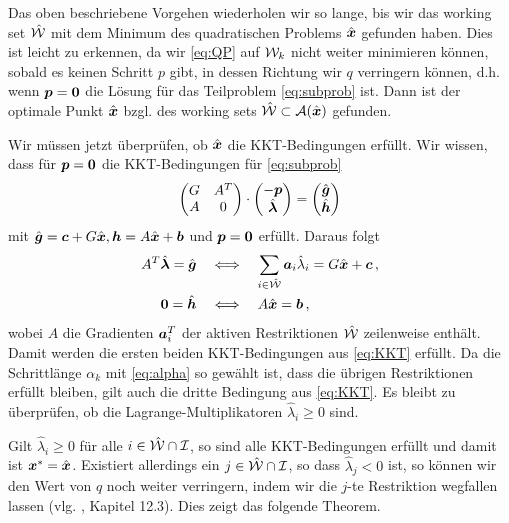 Das oben beschriebene Vorgehen wiederholen wir so lange, bis wir das {working set} $\hat {\mathcal W}$ mit dem Minimum des quadratischen Problems $\hat{\boldsymbol x}$ gefunden haben. Dies ist leicht zu erkennen, da wir \eqref{eq:QP} auf $\mathcal W_k$ nicht weiter minimieren können, sobald es keinen Schritt $p$ gibt, in dessen Richtung wir $q$ verringern können, d.h. wenn $\boldsymbol p = \boldsymbol 0$ die Lösung für das Teilproblem \eqref{eq:subprob} ist.  Dann ist der optimale Punkt $\hat{\boldsymbol x}$ bzgl. des {working sets} $\hat{\mathcal W}\subset \mathcal A(\hat{\boldsymbol x})$ gefunden.

Wir müssen jetzt überprüfen, ob $\hat{\boldsymbol x}$ die KKT-Bedingungen erfüllt. Wir wissen, dass für $\boldsymbol p= \boldsymbol 0$ die KKT-Bedingungen für \eqref{eq:subprob}
\begin{align*}
\begin{pmatrix}
	G & A^T \\
	A & 0
\end{pmatrix} \cdot
\begin{pmatrix} 
-\boldsymbol p \\
\hat{\boldsymbol\lambda}
 \end{pmatrix} =
 \begin{pmatrix}
 	\hat{\boldsymbol g} \\
	\hat{\boldsymbol h}
 \end{pmatrix}
\end{align*}
mit $\hat{\boldsymbol g} = \boldsymbol c + G\hat{\boldsymbol x}, \boldsymbol h = A\hat{\boldsymbol x}+\boldsymbol b$ und $\boldsymbol p=\boldsymbol 0$ erfüllt. Daraus folgt
\begin{align*}
	A^T \hat{\boldsymbol \lambda} = \hat{\boldsymbol g}  \quad &\Longleftrightarrow \quad \sum_{i \in \hat{\mathcal W}}\boldsymbol a_i \hat\lambda_i = G\hat{\boldsymbol x} +\boldsymbol c \, , \\
	\boldsymbol 0 = \hat{\boldsymbol h} \quad  & \Longleftrightarrow \quad A\hat{\boldsymbol x} =\boldsymbol b\, , 
\end{align*}
wobei $A$ die Gradienten $\boldsymbol a_i^T$ der aktiven Restriktionen $\hat{\mathcal W}$ zeilenweise  enthält. Damit werden die ersten beiden KKT-Bedingungen aus \eqref{eq:KKT} erfüllt. Da die Schrittlänge $\alpha_k$ mit \eqref{eq:alpha} so gewählt ist, dass die übrigen Restriktionen erfüllt bleiben, gilt auch die dritte Bedingung aus \eqref{eq:KKT}. Es bleibt zu überprüfen, ob die Lagrange-Multiplikatoren $\hat\lambda_i \ge 0$ sind.

Gilt $\hat\lambda_i \ge 0$ für alle $i \in \hat{\mathcal W} \cap \mathcal I$, so sind alle KKT-Bedingungen erfüllt und damit ist $\boldsymbol x^* = \hat{\boldsymbol x}$. Existiert allerdings ein $j \in \hat{\mathcal W} \cap \mathcal I$, so dass $\hat \lambda_j < 0$ ist, so können wir den Wert von $q$ noch weiter verringern, indem wir die $j$-te Restriktion wegfallen lassen (vlg. \cite{NocWri}, Kapitel 12.3). Dies zeigt das folgende Theorem.


